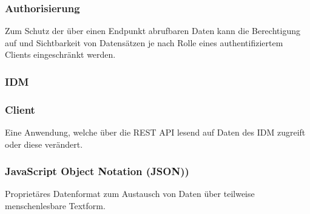 \subsubsection*{Authorisierung}

Zum Schutz der über einen Endpunkt abrufbaren Daten kann die Berechtigung auf und Sichtbarkeit von Datensätzen je nach Rolle eines authentifiziertem Clients eingeschränkt werden.

\subsubsection*{IDM}

\subsubsection*{Client}

Eine Anwendung, welche über die REST API lesend auf Daten des IDM zugreift oder diese verändert.

\subsubsection*{JavaScript Object Notation (JSON))}

Proprietäres Datenformat zum Austausch von Daten über teilweise menschenlesbare Textform.
